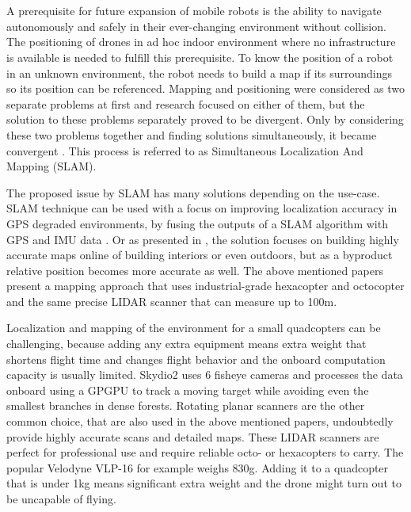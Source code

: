 \chapter{\bevezetes}





A prerequisite for future expansion of mobile robots is the ability to navigate autonomously and safely in their ever-changing
environment without collision. The positioning of drones in ad hoc indoor environment where no infrastructure is available is 
needed to fulfill this prerequisite. To know the position of a robot in an unknown environment, the robot needs to build a map
if its surroundings so its position can be referenced. Mapping and positioning were considered as two separate problems 
at first and research focused on either of them, but the solution to these problems separately proved to be divergent. Only 
by considering these two problems together and finding solutions simultaneously, it became convergent 
\cite{durrant2006simultaneous}. This process is referred to as Simultaneous Localization And Mapping (SLAM).

The proposed issue by SLAM has many solutions depending on the use-case. SLAM technique can be used with a 
focus on improving localization accuracy in GPS degraded environments, by fusing the outputs of a SLAM algorithm with GPS and
IMU data \cite{hening20173d}. Or as presented in \cite{droeschel2018efficient}, the solution focuses on building highly accurate maps
online of building interiors or even outdoors, but as a byproduct relative position becomes more accurate as well. The 
above mentioned papers present a mapping approach that uses industrial-grade hexacopter and octocopter and the same 
precise LIDAR scanner that can measure up to 100m. 

Localization and mapping of the environment for a small quadcopters can be challenging, because adding any extra equipment means
extra weight that shortens flight time and changes flight behavior and the onboard computation capacity is usually limited. 
Skydio2 \cite{SkydioWebsite} uses 6 fisheye cameras and processes the data onboard using a GPGPU to track a moving target
while avoiding even the smallest branches in dense forests.
Rotating planar scanners are the other common choice, that are also used in the above mentioned papers, undoubtedly 
provide highly accurate scans and detailed maps. These LIDAR scanners are perfect for professional use and require reliable
octo- or hexacopters to carry. The popular Velodyne VLP-16 for example weighs 830g. Adding it to a quadcopter that is under 
1kg means significant extra weight and the drone might turn out to be uncapable of flying. 

